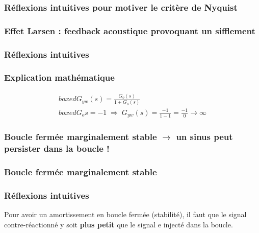 \documentclass[document.tex]{subfiles}
\begin{document}

\subsubsection{Réflexions intuitives pour motiver le critère de Nyquist}


\subsubsection{Effet Larsen : feedback acoustique provoquant un sifflement}


\subsubsection{Réflexions intuitives}


\subsubsection{Explication mathématique}

\begin{equation}
\begin{array}{c}
boxed{G_{yw}(s)=\frac{G_o(s)}{1+G_o(s)}} \\
boxed{G_o{s}=-1 \; \Rightarrow \; G_{yw}(s) = \frac{-1}{1-1} = \frac{-1}{0} \rightarrow \infty}
\end{array}
\end{equation}


\subsubsection{Boucle fermée marginalement stable $\rightarrow$ un sinus peut persister dans la boucle !}


\subsubsection{Boucle fermée marginalement stable}


\subsubsection{Réflexions intuitives}
Pour avoir un amortissement en boucle fermée (stabilité), il faut que le signal contre-réactionné y soit \textbf{plus petit} que le signal e injecté dans la boucle.
\end{document}
